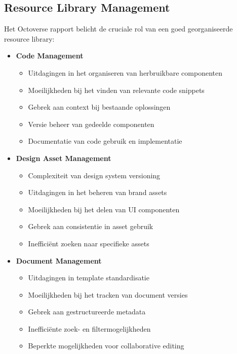 \subsection{Resource Library Management}
\label{subsec:resource-library}

Het \textcite{GitHub2023} Octoverse rapport belicht de cruciale rol van een goed georganiseerde resource library:

\begin{itemize}
    \item \textbf{Code Management}
    \begin{itemize}
        \item Uitdagingen in het organiseren van herbruikbare componenten
        \item Moeilijkheden bij het vinden van relevante code snippets
        \item Gebrek aan context bij bestaande oplossingen
        \item Versie beheer van gedeelde componenten
        \item Documentatie van code gebruik en implementatie
    \end{itemize}
    
    \item \textbf{Design Asset Management}
    \begin{itemize}
        \item Complexiteit van design system versioning
        \item Uitdagingen in het beheren van brand assets
        \item Moeilijkheden bij het delen van UI componenten
        \item Gebrek aan consistentie in asset gebruik
        \item Inefficiënt zoeken naar specifieke assets
    \end{itemize}
    
    \item \textbf{Document Management}
    \begin{itemize}
        \item Uitdagingen in template standardisatie
        \item Moeilijkheden bij het tracken van document versies
        \item Gebrek aan gestructureerde metadata
        \item Inefficiënte zoek- en filtermogelijkheden
        \item Beperkte mogelijkheden voor collaborative editing
    \end{itemize}
\end{itemize}

